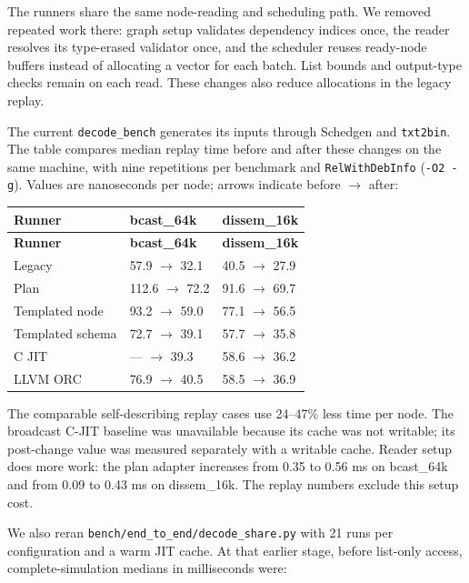 \documentclass[10pt,a4paper]{article}
\begin{document}
The runners share the same node-reading and scheduling path. We removed repeated work there: graph setup validates dependency indices once, the reader resolves its type-erased validator once, and the scheduler reuses ready-node buffers instead of allocating a vector for each batch. List bounds and output-type checks remain on each read. These changes also reduce allocations in the legacy replay.

The current \texttt{decode\_bench} generates its inputs through Schedgen and \texttt{txt2bin}. The table compares median replay time before and after these changes on the same machine, with nine repetitions per benchmark and \texttt{RelWithDebInfo} (\texttt{-O2 -g}). Values are nanoseconds per node; arrows indicate before \(\rightarrow\) after:

{\small
\begin{longtable}{P{0.24\dimexpr{}\tabcolsep\relax}P{0.38\dimexpr{}\tabcolsep\relax}P{0.38\dimexpr{}\tabcolsep\relax}}
\toprule
\textbf{Runner} & \textbf{bcast\_64k} & \textbf{dissem\_16k} \\
\midrule
\endfirsthead
\toprule
\textbf{Runner} & \textbf{bcast\_64k} & \textbf{dissem\_16k} \\
\midrule
\endhead
\bottomrule
\endfoot
Legacy & 57.9 \(\rightarrow\) 32.1 & 40.5 \(\rightarrow\) 27.9 \\
Plan & 112.6 \(\rightarrow\) 72.2 & 91.6 \(\rightarrow\) 69.7 \\
Templated node & 93.2 \(\rightarrow\) 59.0 & 77.1 \(\rightarrow\) 56.5 \\
Templated schema & 72.7 \(\rightarrow\) 39.1 & 57.7 \(\rightarrow\) 35.8 \\
C JIT & --- \(\rightarrow\) 39.3 & 58.6 \(\rightarrow\) 36.2 \\
LLVM ORC & 76.9 \(\rightarrow\) 40.5 & 58.5 \(\rightarrow\) 36.9 \\
\end{longtable}
}

The comparable self-describing replay cases use 24--47\% less time per node. The broadcast C-JIT baseline was unavailable because its cache was not writable; its post-change value was measured separately with a writable cache. Reader setup does more work: the plan adapter increases from 0.35 to 0.56 ms on bcast\_64k and from 0.09 to 0.43 ms on dissem\_16k. The replay numbers exclude this setup cost.

We also reran \texttt{bench/end\_to\_end/decode\_share.py} with 21 runs per configuration and a warm JIT cache. At that earlier stage, before list-only access, complete-simulation medians in milliseconds were:
\end{document}
